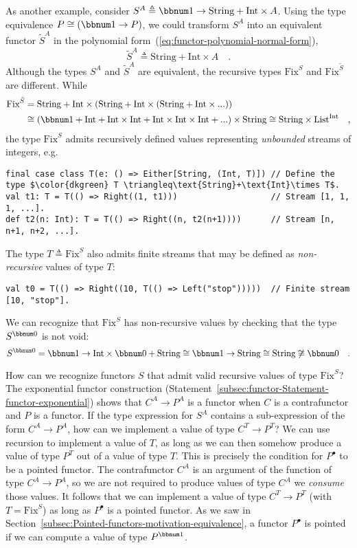As another example, consider $S^{A}\triangleq\bbnum 1\rightarrow\text{String}+\text{Int}\times A$.
Using the type equivalence $P\cong(\bbnum 1\rightarrow P)$, we could
transform $S^{A}$ into an equivalent functor $\tilde{S}^{A}$ in
the polynomial form~(\ref{eq:functor-polynomial-normal-form}),
\[
\tilde{S}^{A}\triangleq\text{String}+\text{Int}\times A\quad.
\]
Although the types $S^{A}$ and $\tilde{S}^{A}$ are equivalent, the
recursive types $\text{Fix}^{S}$ and $\text{Fix}^{\tilde{S}}$ are
different. While 
\begin{align*}
\text{Fix}^{\tilde{S}} & =\text{String}+\text{Int}\times(\text{String}+\text{Int}\times(\text{String}+\text{Int}\times...))\\
 & \cong\left(\bbnum 1+\text{Int}+\text{Int}\times\text{Int}+\text{Int}\times\text{Int}\times\text{Int}+...\right)\times\text{String}\cong\text{String}\times\text{List}^{\text{Int}}\quad,
\end{align*}
the type $\text{Fix}^{S}$ admits recursively defined values representing
\emph{unbounded} streams of integers, e.g.
\begin{lstlisting}[mathescape=true]
final case class T(e: () => Either[String, (Int, T)]) // Define the type $\color{dkgreen} T \triangleq\text{String}+\text{Int}\times T$.
val t1: T = T(() => Right((1, t1)))                   // Stream [1, 1, 1, ...].
def t2(n: Int): T = T(() => Right((n, t2(n+1))))      // Stream [n, n+1, n+2, ...].
\end{lstlisting}
The type $T\triangleq\text{Fix}^{S}$ also admits finite streams that
may be defined as \emph{non-recursive} values of type $T$:
\begin{lstlisting}
val t0 = T(() => Right((10, T(() => Left("stop")))))  // Finite stream [10, "stop"].
\end{lstlisting}
We can recognize that $\text{Fix}^{S}$ has non-recursive values by
checking that the type $S^{\bbnum 0}$ is not void:
\[
S^{\bbnum 0}=\bbnum 1\rightarrow\text{Int}\times\bbnum 0+\text{String}\cong\bbnum 1\rightarrow\text{String}\cong\text{String}\not\cong\bbnum 0\quad.
\]

How can we recognize functors $S$ that admit valid recursive values
of type $\text{Fix}^{S}$? The exponential functor construction (Statement~\ref{subsec:functor-Statement-functor-exponential})
shows that $C^{A}\rightarrow P^{A}$ is a functor when $C$ is a contrafunctor
and $P$ is a functor. If the type expression for $S^{A}$ contains
a sub-expression of the form $C^{A}\rightarrow P^{A}$, how can we
implement a value of type $C^{T}\rightarrow P^{T}$? We can use recursion
to implement a value of $T$, as long as we can then somehow produce
a value of type $P^{T}$ out of a value of type $T$. This is precisely
the condition for $P^{\bullet}$ to be a pointed functor. The contrafunctor
$C^{A}$ is an argument of the function of type $C^{A}\rightarrow P^{A}$,
so we are not required to produce values of type $C^{A}$\textemdash{}
we \emph{consume} those values. It follows that we can implement a
value of type $C^{T}\rightarrow P^{T}$ (with $T=\text{Fix}^{S}$)
as long as $P^{\bullet}$ is a pointed functor. As we saw in Section~\ref{subsec:Pointed-functors-motivation-equivalence},
a functor $P^{\bullet}$ is pointed if we can compute a value of type
$P^{\bbnum 1}$.

